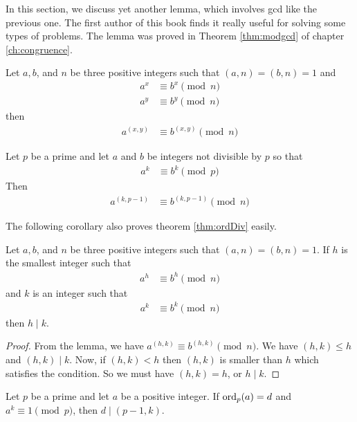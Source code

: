 \documentclass{subfile}
\begin{document}
	In this section, we discuss yet another lemma, which involves gcd like the previous one. The first author of this book finds it really useful for solving some types of problems. The lemma was proved in Theorem \eqref{thm:modgcd} of chapter \eqref{ch:congruence}.
		\begin{lemma}
			Let $a, b$, and $n$ be three positive integers such that $(a,n)=(b,n)=1$ and
				\begin{align*}
					a^x &\equiv b^x\pmod n\\
					a^y &\equiv b^y\pmod n
				\end{align*}
			then
				\begin{align*}
					a^{(x,y)} &\equiv b^{(x,y)}\pmod n
				\end{align*}
		\end{lemma}

		\begin{corollary}
			Let $p$ be a prime and let $a$ and $b$ be integers not divisible by $p$ so that
				\begin{align*}
					a^k &\equiv b^k\pmod p
				\end{align*}
			Then
				\begin{align*}
					a^{(k,p-1)} &\equiv b^{(k,p-1)}\pmod n
				\end{align*}
		\end{corollary}

	The following corollary also proves theorem \eqref{thm:ordDiv} easily.
		\begin{corollary}
			Let $a, b$, and $n$ be three positive integers such that $(a,n)=(b,n)=1$. If $h$ is the smallest integer such that
				\begin{align*}
					a^h &\equiv b^h\pmod n
				\end{align*}
			and $k$ is an integer such that
				\begin{align*}
					a^k &\equiv b^k\pmod n
				\end{align*}
			then $h\mid k$.
		\end{corollary}

		\begin{proof}
			From the lemma, we have $a^{(h,k)}\equiv b^{(h,k)}\pmod n$. We have $(h,k)\leq h$ and $(h,k)\mid k$. Now, if $(h,k)<h$ then $(h,k)$ is smaller than $h$ which satisfies the condition. So we must have $(h,k)=h$, or $h\mid k$.
		\end{proof}

		\begin{corollary}\label{cor:cor2}
			Let $p$ be a prime and let $a$ be a positive integer. If $\operatorname{ord}_p(a)=d$ and $a^k\equiv1\pmod p$, then $d\mid (p-1,k)$.
		\end{corollary}
\end{document}
